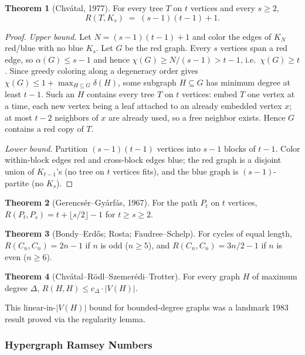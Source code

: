 \documentclass{article}
\theoremstyle{definition}
\newtheorem{theorem}{Theorem}
\begin{document}
\begin{theorem}[Chv\'atal, 1977]
For every tree $T$ on $t$ vertices and every $s \ge 2$,
\[
  R(T, K_s) \;=\; (s - 1)(t - 1) + 1.
\]
\end{theorem}

\begin{proof}
\emph{Upper bound.} Let $N = (s - 1)(t - 1) + 1$ and color the edges of
$K_N$ red/blue with no blue $K_s$. Let $G$ be the red graph. Every $s$
vertices span a red edge, so $\alpha(G) \le s - 1$ and hence
$\chi(G) \ge N/(s - 1) > t - 1$, i.e.\ $\chi(G) \ge t$. Since greedy
coloring along a degeneracy order gives
$\chi(G) \le 1 + \max_{H \subseteq G} \delta(H)$, some subgraph
$H \subseteq G$ has minimum degree at least $t - 1$. Such an $H$
contains every tree $T$ on $t$ vertices: embed $T$ one vertex at a time,
each new vertex being a leaf attached to an already embedded vertex $x$;
at most $t - 2$ neighbors of $x$ are already used, so a free neighbor
exists. Hence $G$ contains a red copy of $T$.

\emph{Lower bound.} Partition $(s - 1)(t - 1)$ vertices into $s - 1$
blocks of $t - 1$. Color within-block edges red and cross-block
edges blue; the red graph is a disjoint union of $K_{t - 1}$'s (no
tree on $t$ vertices fits), and the blue graph is $(s - 1)$-partite
(no $K_s$).
\end{proof}

\begin{theorem}[Gerencs\'er--Gy\'arf\'as, 1967]
For the path $P_t$ on $t$ vertices, $R(P_t, P_s) = t + \lfloor s/2 \rfloor - 1$
for $t \ge s \ge 2$.
\end{theorem}

\begin{theorem}[Bondy--Erd\H{o}s; Rosta; Faudree--Schelp]
For cycles of equal length, $R(C_n, C_n) = 2n - 1$ if $n$ is odd
($n \ge 5$), and $R(C_n, C_n) = 3n/2 - 1$ if $n$ is even ($n \ge 6$).
\end{theorem}

\begin{theorem}[Chv\'atal--R\"odl--Szemer\'edi--Trotter]
For every graph $H$ of maximum degree $\Delta$, $R(H, H) \le c_\Delta \cdot |V(H)|$.
\end{theorem}

This linear-in-$|V(H)|$ bound for bounded-degree graphs was a
landmark 1983 result proved via the regularity lemma.

\subsubsection{Hypergraph Ramsey Numbers}
\end{document}
